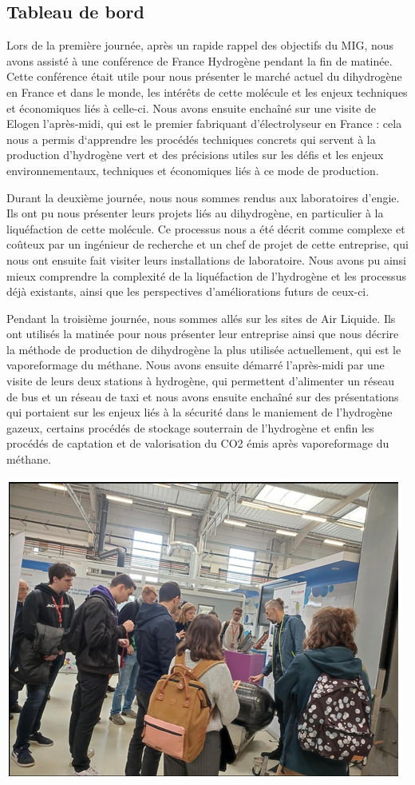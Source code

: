 \documentclass[11pt,french,a4paper]{article}
\begin{document}
\subsection*{Tableau de bord}
Lors de la première journée,  après un rapide rappel des objectifs du MIG, nous avons assisté à une conférence de France Hydrogène pendant la fin de matinée. Cette conférence était utile pour nous présenter le marché actuel du dihydrogène en France et dans le monde, les intérêts de cette molécule et les enjeux techniques et économiques liés à celle-ci. 
Nous avons ensuite enchaîné sur une visite de Elogen l’après-midi, qui est le premier fabriquant d’électrolyseur en France : cela nous a permis d‘apprendre les procédés techniques concrets qui servent à la production d’hydrogène vert et des précisions utiles sur les défis et les enjeux environnementaux, techniques et économiques liés à ce mode de production. 

Durant la deuxième journée, nous nous sommes rendus aux laboratoires d’engie. Ils ont pu nous présenter leurs projets liés au dihydrogène, en particulier à la liquéfaction de cette molécule. Ce processus nous a été décrit comme complexe et coûteux par un ingénieur de recherche et un chef de projet de cette entreprise, qui nous ont ensuite fait visiter leurs installations de laboratoire. Nous avons pu ainsi mieux comprendre la complexité de la liquéfaction de l’hydrogène et les processus déjà existants, ainsi que les perspectives d’améliorations futurs de ceux-ci.

Pendant la troisième journée, nous sommes allés sur les sites de Air Liquide. Ils ont utilisés la matinée pour nous présenter leur entreprise ainsi que nous décrire la méthode de production de dihydrogène la plus utilisée actuellement, qui est le vaporeformage du méthane. Nous avons ensuite démarré l’après-midi par une visite de leurs deux stations à hydrogène, qui permettent d’alimenter un réseau de bus et un réseau de taxi et nous avons ensuite enchaîné sur des présentations qui portaient sur les enjeux liés à la sécurité dans le maniement de l’hydrogène gazeux, certains procédés de stockage souterrain de l’hydrogène et enfin les procédés de captation et de valorisation du CO2 émis après vaporeformage du méthane. 
\begin{center}
\includegraphics[width=0.5\linewidth]{image/annexe/tab_bord1.png}
\end{center}
\end{document}
